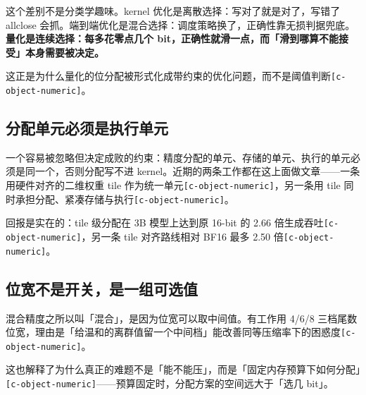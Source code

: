 这个差别不是分类学趣味。kernel 优化是离散选择：写对了就是对了，写错了 allclose 会抓。端到端优化是混合选择：调度策略换了，正确性靠无损判据兜底。\textbf{量化是连续选择：每多花零点几个 bit，正确性就滑一点，而「滑到哪算不能接受」本身需要被决定。}


这正是为什么量化的位分配被形式化成带约束的优化问题，而不是阈值判断{\scriptsize\texttt{[c-\hspace{0pt}object-\hspace{0pt}numeric]}}。


\subsection{分配单元必须是执行单元}

一个容易被忽略但决定成败的约束：精度分配的单元、存储的单元、执行的单元必须是同一个，否则分配写不进 kernel。近期的两条工作都在这上面做文章——一条用硬件对齐的二维权重 tile 作为统一单元{\scriptsize\texttt{[c-\hspace{0pt}object-\hspace{0pt}numeric]}}，另一条用 tile 同时承担分配、紧凑存储与执行{\scriptsize\texttt{[c-\hspace{0pt}object-\hspace{0pt}numeric]}}。


回报是实在的：tile 级分配在 3B 模型上达到原 16-bit 的 2.66 倍生成吞吐{\scriptsize\texttt{[c-\hspace{0pt}object-\hspace{0pt}numeric]}}，另一条 tile 对齐路线相对 BF16 最多 2.50 倍{\scriptsize\texttt{[c-\hspace{0pt}object-\hspace{0pt}numeric]}}。


\subsection{位宽不是开关，是一组可选值}

混合精度之所以叫「混合」，是因为位宽可以取中间值。有工作用 4/6/8 三档尾数位宽，理由是「给温和的离群值留一个中间档」能改善同等压缩率下的困惑度{\scriptsize\texttt{[c-\hspace{0pt}object-\hspace{0pt}numeric]}}。


这也解释了为什么真正的难题不是「能不能压」，而是「固定内存预算下如何分配」{\scriptsize\texttt{[c-\hspace{0pt}object-\hspace{0pt}numeric]}}——预算固定时，分配方案的空间远大于「选几 bit」。


